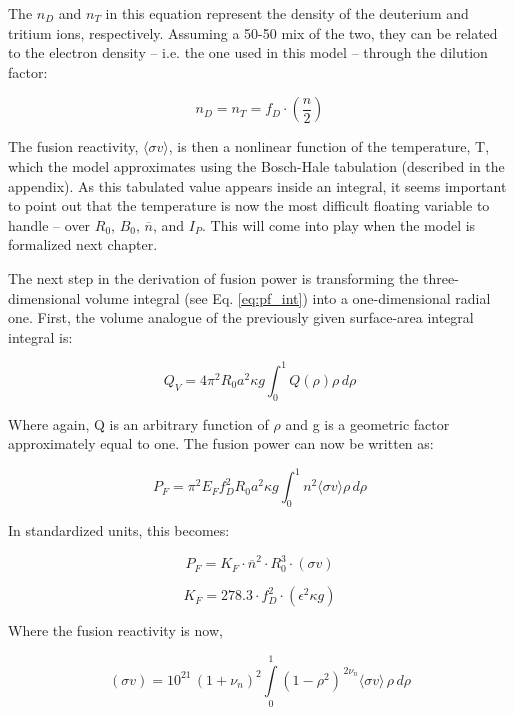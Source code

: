  The $n_D$ and $n_T$ in this equation represent the density of the deuterium and tritium ions, respectively. Assuming a 50-50 mix of the two, they can be related to the electron density -- i.e. the one used in this model -- through the dilution factor:
 
 \begin{equation}
 	n_D = n_T = f_D \cdot \left( \frac{n}{2} \right)
 \end{equation}
 
 The fusion reactivity, $\langle \sigma v \rangle$, is then a nonlinear function of the temperature, T, which the model approximates using the Bosch-Hale tabulation (described in the appendix). As this tabulated value appears inside an integral, it seems important to point out that the temperature is now the most difficult floating variable to handle -- over $R_0$, $B_0$, $\overline n$, and $I_P$. This will come into play when the model is formalized next chapter.
 
 The next step in the derivation of fusion power is transforming the three-dimensional volume integral (see Eq. \ref{eq:pf_int}) into a one-dimensional radial one. First, the volume analogue of the previously given surface-area integral integral is:
 
 \begin{equation}
 	Q_V = 4 \pi^2 R_0 a^2 \kappa g \int_0^1 Q(\rho) \rho \, d\rho
 \end{equation}
 
 Where again, Q is an arbitrary function of $\rho$ and g is a geometric factor approximately equal to one. The fusion power can now be written as:
 
 \begin{equation}
 	P_F = \pi^2 E_F f_D^2 R_0 a^2 \kappa g \int_0^1 n^2 \langle \sigma v \rangle \rho \, d\rho
 \end{equation}
 
 In standardized units, this becomes:
 
\begin{equation}
	\label{eq:pf}
	P_F = K_F \cdot \overline{n}^2 \cdot R_0^3  \cdot (\sigma v)
\end{equation}

\begin{equation}
  K_F = 278.3 \cdot f_D^2 \cdot ( \epsilon^2 \kappa g )
\end{equation}

Where the fusion reactivity is now,

\begin{equation}
   (\sigma v) = 10^{21} \, (1+\nu_n)^2 \int\limits_0^1 ( 1 - \rho^2 ) ^ { \, 2 \nu_n} \langle \sigma v \rangle \, \rho \, d\rho
\end{equation}

